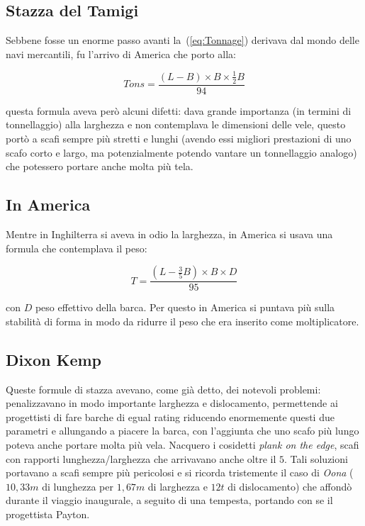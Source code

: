 		\subsection{Stazza del Tamigi}
		
			Sebbene fosse un enorme passo avanti la~(\ref{eq:Tonnage}) derivava dal mondo delle navi mercantili, fu l'arrivo di America che porto alla:
		
			\begin{center}
				\begin{equation}
					Tons=\frac{(L-B) \times B \times \frac{1}{2}B}{94}
					\label{eq:Thames}
				\end{equation}
			\end{center}
		
			questa formula aveva però alcuni difetti: dava grande importanza (in termini di tonnellaggio) alla larghezza e non contemplava le dimensioni delle vele, questo portò a scafi sempre più stretti e lunghi (avendo essi migliori prestazioni di uno scafo corto e largo, ma potenzialmente potendo vantare un tonnellaggio analogo) che potessero portare anche molta più tela.
		
		\subsection{In America}
			Mentre in Inghilterra si aveva in odio la larghezza, in America si usava una formula che contemplava il peso:
			\begin{center}
				\begin{equation}
					T=\frac{(L-\frac{3}{5}B) \times B \times D}{95}
					\label{eq:America}
				\end{equation}
			\end{center}
			con $D$ peso effettivo della barca.
			Per questo in America si puntava più sulla stabilità di forma in modo da ridurre il peso che era inserito come moltiplicatore.
			
		\subsection{Dixon Kemp}
			Queste formule di stazza avevano, come già detto, dei notevoli problemi: penalizzavano in modo importante larghezza e dislocamento, permettende ai progettisti di fare barche di egual rating riducendo enormemente questi due parametri e allungando a piacere la barca, con l'aggiunta che uno scafo più lungo poteva anche portare molta più vela. Nacquero i cosidetti \emph{plank on the edge}, scafi con rapporti lunghezza/larghezza che arrivavano anche oltre il $5$. Tali soluzioni portavano a scafi sempre più pericolosi e si ricorda tristemente il caso di \textit{Oona} ($10,33m$ di lunghezza per $1,67m$ di larghezza e $12t$ di dislocamento) che affondò durante il viaggio inaugurale, a seguito di una tempesta, portando con se il progettista Payton.
			
